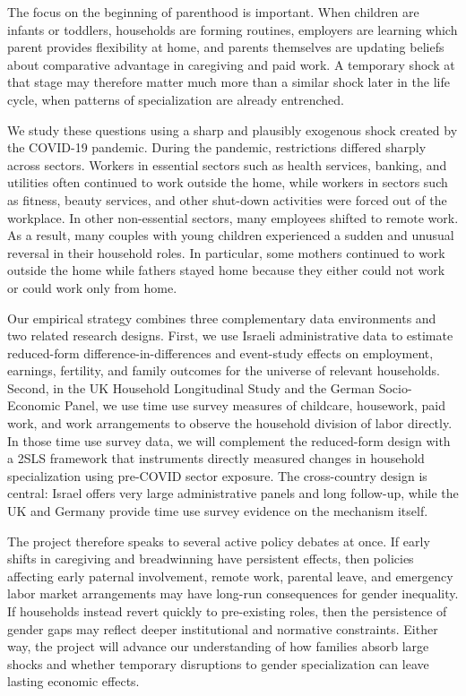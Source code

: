 \documentclass[12pt]{article}
\begin{document}
The focus on the beginning of parenthood is important. When children are infants or toddlers, households are forming routines, employers are learning which parent provides flexibility at home, and parents themselves are updating beliefs about comparative advantage in caregiving and paid work. A temporary shock at that stage may therefore matter much more than a similar shock later in the life cycle, when patterns of specialization are already entrenched.

We study these questions using a sharp and plausibly exogenous shock created by the COVID-19 pandemic. During the pandemic, restrictions differed sharply across sectors. Workers in essential sectors such as health services, banking, and utilities often continued to work outside the home, while workers in sectors such as fitness, beauty services, and other shut-down activities were forced out of the workplace. In other non-essential sectors, many employees shifted to remote work. As a result, many couples with young children experienced a sudden and unusual reversal in their household roles. In particular, some mothers continued to work outside the home while fathers stayed home because they either could not work or could work only from home.

Our empirical strategy combines three complementary data environments and two related research designs. First, we use Israeli administrative data to estimate reduced-form difference-in-differences and event-study effects on employment, earnings, fertility, and family outcomes for the universe of relevant households. Second, in the UK Household Longitudinal Study and the German Socio-Economic Panel, we use time use survey measures of childcare, housework, paid work, and work arrangements to observe the household division of labor directly. In those time use survey data, we will complement the reduced-form design with a 2SLS framework that instruments directly measured changes in household specialization using pre-COVID sector exposure. The cross-country design is central: Israel offers very large administrative panels and long follow-up, while the UK and Germany provide time use survey evidence on the mechanism itself. 

The project therefore speaks to several active policy debates at once. If early shifts in caregiving and breadwinning have persistent effects, then policies affecting early paternal involvement, remote work, parental leave, and emergency labor market arrangements may have long-run consequences for gender inequality. If households instead revert quickly to pre-existing roles, then the persistence of gender gaps may reflect deeper institutional and normative constraints. Either way, the project will advance our understanding of how families absorb large shocks and whether temporary disruptions to gender specialization can leave lasting economic effects.
\end{document}
